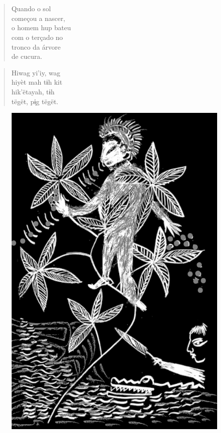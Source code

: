 \chapter*{}

\mbox{}\vspace*{\fill}

\begin{verse}
Quando o sol\\
começou a nascer,\\
o homem hup bateu\\
com o terçado no\\
tronco da árvore\\
de cucura.
\end{verse}

\begin{verse}
Hiwag yi’iy, wag\\
hiyèt mah tɨh kit\\
hik’ëtayah, tɨh\\
tëgët, pɨ̗g tëgët.
\end{verse}

\vspace*{\fill}

\begin{figure}
\vspace*{-1.2cm}
\hspace*{-2.2cm}\includegraphics[width=138mm]{./imgs/img5.jpg}
\end{figure}

